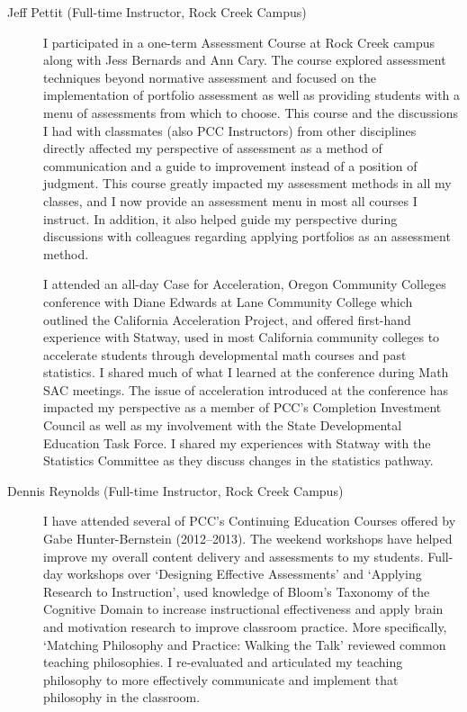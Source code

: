 \begin{description}
	\item[Jeff Pettit (Full-time Instructor, Rock Creek Campus)]
	I participated in a one-term Assessment Course at Rock Creek campus along with
	Jess Bernards and Ann Cary. The course explored assessment techniques beyond
	normative assessment and focused on the implementation of portfolio assessment
	as well as providing students with a menu of assessments from which to choose.
	This course and the discussions I had with classmates (also PCC Instructors)
	from other disciplines directly affected my perspective of assessment as a
	method of communication and a guide to improvement instead of a position of
	judgment. This course greatly impacted my assessment methods in all my classes,
	and I now provide an assessment menu in most all courses I instruct. In
	addition, it also helped guide my perspective during discussions with
	colleagues regarding applying portfolios as an assessment method.

	I attended an all-day Case for Acceleration, Oregon Community Colleges
	conference with Diane Edwards at Lane Community College which outlined the
	California Acceleration Project, and offered first-hand experience with
	Statway, used in most California community colleges to accelerate students
	through developmental math courses and past statistics. I shared much of what I
	learned at the conference during Math SAC meetings. The issue of acceleration
	introduced at the conference has impacted my perspective as a member of
	PCC's Completion Investment Council as well as my involvement with the State
	Developmental Education Task Force. I shared my experiences with Statway with
	the Statistics Committee as they discuss changes in the statistics pathway.

	\item[Dennis Reynolds (Full-time Instructor, Rock Creek Campus)]
	I have attended several of PCC's Continuing Education Courses offered by
	Gabe Hunter-Bernstein (2012--2013).  The weekend workshops have helped
	improve my overall content delivery and assessments to my students. Full-day
	workshops over `Designing Effective Assessments' and `Applying
	Research to Instruction', used knowledge of Bloom's Taxonomy of the
	Cognitive Domain to increase instructional effectiveness and apply brain and
	motivation research to improve classroom practice. More specifically,
	`Matching Philosophy and Practice: Walking the Talk' reviewed common
	teaching philosophies. I re-evaluated and articulated my teaching philosophy to
	more effectively communicate and implement that philosophy in the classroom.


\end{description}
